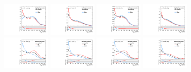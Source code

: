 \begin{figure}[htbp]
  \centering
  \includegraphics[width=0.21\textwidth]{fig/uncertainties/systs_nonRes_e_HP_nobb_LDy_logWeight_ProjY.pdf}
  \includegraphics[width=0.21\textwidth]{fig/uncertainties/systs_nonRes_e_LP_nobb_LDy_logWeight_ProjY.pdf}
  \includegraphics[width=0.21\textwidth]{fig/uncertainties/systs_nonRes_e_HP_nobb_HDy_logWeight_ProjY.pdf}
  \includegraphics[width=0.21\textwidth]{fig/uncertainties/systs_nonRes_e_LP_nobb_HDy_logWeight_ProjY.pdf}\\
  \includegraphics[width=0.21\textwidth]{fig/uncertainties/systs_nonRes_e_HP_nobb_LDy_MJJScale_ProjY.pdf}
  \includegraphics[width=0.21\textwidth]{fig/uncertainties/systs_nonRes_e_LP_nobb_LDy_MJJScale_ProjY.pdf}
  \includegraphics[width=0.21\textwidth]{fig/uncertainties/systs_nonRes_e_HP_nobb_HDy_MJJScale_ProjY.pdf}
  \includegraphics[width=0.21\textwidth]{fig/uncertainties/systs_nonRes_e_LP_nobb_HDy_MJJScale_ProjY.pdf}\\

\end{figure}
